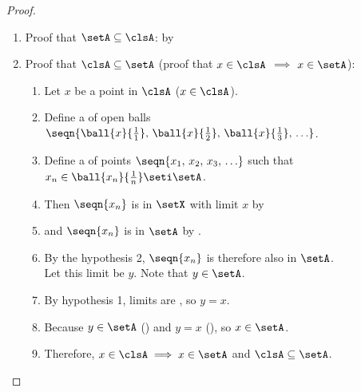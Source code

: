 \begin{proof}
\begin{enumerate}
  \item Proof that $\setA\subseteq\clsA$: by 
  \item Proof that $\clsA\subseteq\setA$ (proof that $x\in\clsA$ $\implies$ $x\in\setA$):
    \begin{enumerate}
      \item Let $x$ be a point in $\clsA$ ($x\in\clsA$).
      \item Define a  of open balls $\seqn{\ball{x}{\frac{1}{1}},\,\ball{x}{\frac{1}{2}},\,\ball{x}{\frac{1}{3}},\,\ldots}$.
      \item Define a  of points $\seqn{x_1,\,x_2,\,x_3,\,\ldots}$ such that $x_n\in\ball{x_n}{\frac{1}{n}}\seti\setA$.
      \item Then $\seqn{x_n}$ is  in $\setX$ with limit $x$ by 
      \item and  $\seqn{x_n}$ is  in $\setA$ by .
      \item By the hypothesis 2, $\seqn{x_n}$ is therefore also  in $\setA$.\\
            Let this limit be $y$. Note that $y\in\setA$.\label{item:com_cls_yY}
      \item By hypothesis 1, limits are , so $y=x$. \label{item:com_cls_yx}
      \item Because $y\in\setA$ () and $y=x$ (), so $x\in\setA$.
      \item Therefore, $x\in\clsA\implies x\in\setA$ and $\clsA\subseteq\setA$.
    \end{enumerate}
\end{enumerate}
\end{proof}

